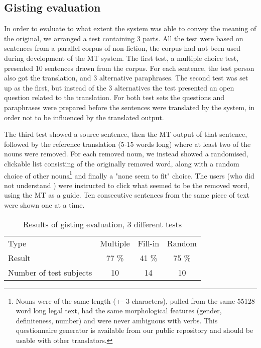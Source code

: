 \subsection{Gisting evaluation}
  
In order to evaluate to what extent the system was able to convey the
meaning of the original, we arranged a test containing 3 parts. All
the test were based on sentences from a parallel corpus of
non-fiction, the corpus had not been used during development of the MT
system. The first test, a multiple choice test, presented 10 sentences
drawn from the corpus. For each sentence, the test person also got the
translation, and 3 alternative paraphrases. The second test was set up
as the first, but instead of the 3 alternatives the test presented an
open question related to the translation. For both test sets the 
questions and paraphrases were prepared before the sentences were 
translated by the system, in order not to be influenced by the 
translated output.

The third test showed a \sme{} source sentence, then the MT output of
that sentence, followed by the reference translation (5-15 words long)
where at least two of the nouns were removed. For each removed noun,
we instead showed a randomised, clickable list consisting of the
originally removed word, along with a random choice of other
nouns\footnote{Nouns were of the same length (+- 3 characters), pulled
  from the same 55128 word long legal text, had the same morphological
  features (gender, definiteness, number) and were never ambiguous
  with verbs. This questionnaire generator is available from our
  public repository and should be usable with other translators.} and
finally a "none seem to fit" choice. The users (who did not understand
\sme{}) were instructed to click what seemed to be the removed word,
using the MT as a guide. Ten consecutive sentences from the same piece
of text were shown one at a time.

\begin{table}[htdp]
\caption{Results of gisting evaluation, 3 different tests}
\begin{center}
\begin{tabular}{lccc}
Type & Multiple & Fill-in & Random \\
Result & 77 \% & 41 \% & 75 \% \\
Number of test subjects & 10 & 14  & 10  \\
\end{tabular}
\end{center}
\label{eval}
\end{table}%



